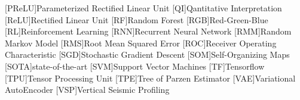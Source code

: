 \begin{acronym}[DCGANS]
[PReLU]{Parameterized Rectified Linear Unit}
[QI]{Qantitative Interpretation}
[ReLU]{Rectified Linear Unit}
[RF]{Random Forest}
[RGB]{Red-Green-Blue}
[RL]{Reinforcement Learning}
[RNN]{Recurrent Neural Network}
[RMM]{Random Markov Model}
[RMS]{Root Mean Squared Error}
[ROC]{Receiver Operating Characteristic}
[SGD]{Stochastic Gradient Descent}
[SOM]{Self-Organizing Maps}
[SOTA]{state-of-the-art}
[SVM]{Support Vector Machines}
[TF]{Tensorflow}
[TPU]{Tensor Processing Unit}
[TPE]{Tree of Parzen Estimator}
[VAE]{Variational AutoEncoder}
[VSP]{Vertical Seismic Profiling}
\end{acronym}

